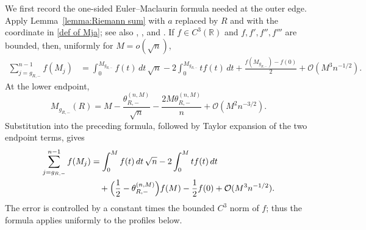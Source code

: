 \documentclass[a4paper]{article}
\numberwithin{equation}{section}
\begin{document}
We first record the one-sided Euler--Maclaurin formula needed at the outer
edge.  Apply Lemma~\ref{lemma:Riemann sum} with $a$ replaced by $R$ and with
the coordinate in \eqref{def of Mja}; see also
\cite[Eqs.~(2.26), (2.27)]{C2021 FH}, \cite[Eq.~(3.49)]{C2021}, and
\cite[Lemma~3.4]{CL2023}.  If $f\in C^3(\mathbb R)$ and
$f,f',f'',f'''$ are bounded, then, uniformly for $M=o(\sqrt n)$,
\begin{align*}
\sum_{j=g_{R,-}}^{n-1}f(M_j)
&=\int_{0}^{M_{g_{R,-}}}f(t)\,dt\,\sqrt{n}
-2\int_{0}^{M_{g_{R,-}}}tf(t)\,dt
+\frac{f(M_{g_{R,-}})-f(0)}{2}
+\mathcal{O}(M^3n^{-1/2}). 
\end{align*}
At the lower endpoint,
\[
M_{g_{R,-}}(R)=M-\frac{\theta_{R,-}^{(n,M)}}{\sqrt n}
-\frac{2M\theta_{R,-}^{(n,M)}}{n}
+\mathcal O(M^2n^{-3/2}).
\]
Substitution into the preceding formula, followed by Taylor expansion of the
two endpoint terms, gives
\begin{align}
\begin{split}
\label{def of one sided Riemann sum}
\sum_{j=g_{R,-}}^{n-1}f(M_j)
&=
\int_0^{M}f(t)\,dt\,\sqrt{n}
-2\int_0^{M}tf(t)\,dt
\\
&\quad 
+\Bigl(\frac{1}{2}-\theta_{R,-}^{(n,M)}\Bigr)f(M)
-\frac{1}{2}f(0)
+\mathcal{O}(M^3n^{-1/2}). 
\end{split}
\end{align}
The error is controlled by a constant times the bounded $C^3$ norm of $f$;
thus the formula applies uniformly to the profiles below.
\end{document}

